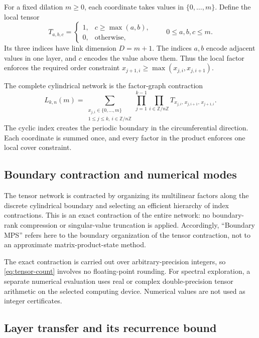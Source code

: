 \documentclass[11pt,a4paper]{article}
\theoremstyle{definition}
\begin{document}
For a fixed dilation $m\ge0$, each coordinate takes values in $\{0,\ldots,m\}$. Define the local tensor
\begin{equation}\label{eq:local-tensor}
T_{a,b,c}=
\begin{cases}
1,&c\ge\max(a,b),\\
0,&\text{otherwise},
\end{cases}
\qquad 0\le a,b,c\le m.
\end{equation}
Its three indices have link dimension $D=m+1$. The indices $a,b$ encode adjacent values in one layer, and $c$ encodes the value above them. Thus the local factor enforces the required order constraint $x_{j+1,i}\ge\max(x_{j,i},x_{j,i+1})$.

The complete cylindrical network is the factor-graph contraction
\begin{equation}\label{eq:tensor-count}
L_{k,n}(m)=
\sum_{\substack{x_{j,i}\in\{0,\ldots,m\}\\
1\le j\le k,\ i\in\mathbb{Z}/n\mathbb{Z}}}
\prod_{j=1}^{k-1}\prod_{i\in\mathbb{Z}/n\mathbb{Z}}
T_{x_{j,i},\,x_{j,i+1},\,x_{j+1,i}}.
\end{equation}
The cyclic index creates the periodic boundary in the circumferential direction. Each coordinate is summed once, and every factor in the product enforces one local cover constraint.

\subsection{Boundary contraction and numerical modes}

The tensor network is contracted by organizing its multilinear factors
along the discrete cylindrical boundary and selecting an efficient
hierarchy of index contractions. This is an exact contraction of the
entire network: no boundary-rank compression or singular-value
truncation is applied. Accordingly, ``Boundary MPS'' refers here to the
boundary organization of the tensor contraction, not to an approximate
matrix-product-state method.

The exact contraction is carried out over arbitrary-precision integers,
so \eqref{eq:tensor-count} involves no floating-point rounding. For
spectral exploration, a separate numerical evaluation uses real or
complex double-precision tensor arithmetic on the selected computing
device. Numerical values are not used as integer certificates.

\subsection{Layer transfer and its recurrence bound}
\end{document}
